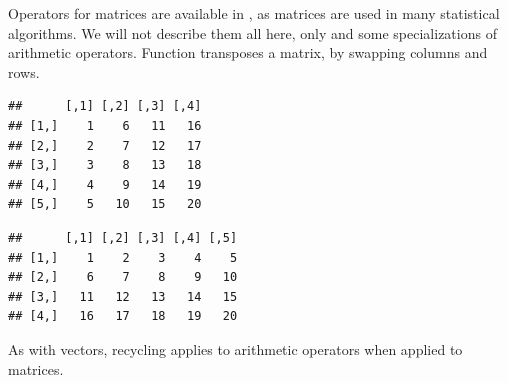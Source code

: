 \documentclass[krantz2]{krantz}\usepackage{knitr}
\begin{document}
Operators for matrices are available in \Rlang, as matrices are used in many statistical algorithms. We will not describe them all here, only  and some specializations of arithmetic operators. Function  transposes a matrix, by swapping columns and rows.

\begin{knitrout}\footnotesize
{}\color{fgcolor}\begin{kframe}
\begin{alltt}
 \hlkwb{<-} \hlstd{(}\hlopt{:}\hlstd{,}  \hlstd{=} \hlstd{)}
\end{alltt}
\begin{verbatim}
##      [,1] [,2] [,3] [,4]
## [1,]    1    6   11   16
## [2,]    2    7   12   17
## [3,]    3    8   13   18
## [4,]    4    9   14   19
## [5,]    5   10   15   20
\end{verbatim}
\begin{alltt}
\end{alltt}
\begin{verbatim}
##      [,1] [,2] [,3] [,4] [,5]
## [1,]    1    2    3    4    5
## [2,]    6    7    8    9   10
## [3,]   11   12   13   14   15
## [4,]   16   17   18   19   20
\end{verbatim}
\end{kframe}
\end{knitrout}

As with vectors, recycling applies to arithmetic operators when applied to matrices.
\end{document}

